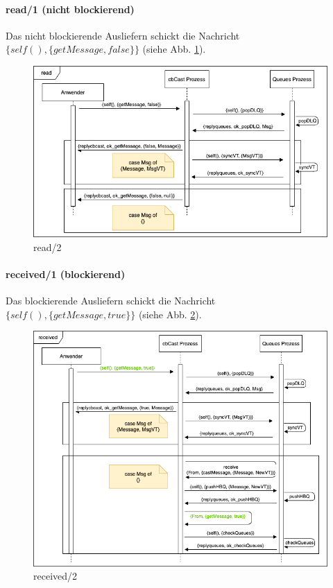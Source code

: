 \paragraph{read/1 (nicht blockierend)}

Das nicht blockierende Ausliefern schickt die Nachricht $\{self(), \{getMessage, false\}\}$ (siehe Abb. \ref{fig:sequence_read_realisierung}).

\begin{figure}[htbp]
\begin{center}
\includegraphics[scale=0.6]{Latex/Bilder/read_realisierung.png}
\caption{\label{fig:sequence_read_realisierung} read/2}
\end{center}
\end{figure}

\paragraph{received/1 (blockierend)}

Das blockierende Ausliefern schickt die Nachricht \\$\{self(), \{getMessage, true\}\}$ (siehe Abb. \ref{fig:sequence_received_realisierung}).

\begin{figure}[htbp]
\begin{center}
\includegraphics[scale=0.6]{Latex/Bilder/receive_realisierung.png}
\caption{\label{fig:sequence_received_realisierung} received/2}
\end{center}
\end{figure}

